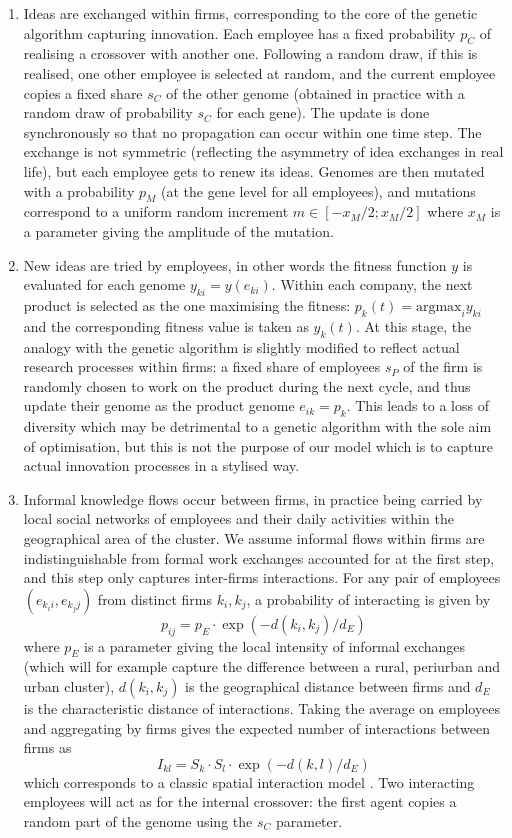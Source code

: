 \documentclass[letterpaper]{article}
\begin{document}
\begin{enumerate}
    \item Ideas are exchanged within firms, corresponding to the core of the genetic algorithm capturing innovation. Each employee has a fixed probability $p_C$ of realising a crossover with another one. Following a random draw, if this is realised, one other employee is selected at random, and the current employee copies a fixed share $s_C$ of the other genome (obtained in practice with a random draw of probability $s_C$ for each gene). The update is done synchronously so that no propagation can occur within one time step. The exchange is not symmetric (reflecting the asymmetry of idea exchanges in real life), but each employee gets to renew its ideas. Genomes are then mutated with a probability $p_M$ (at the gene level for all employees), and mutations correspond to a uniform random increment $m \in \left[ -x_M/2 ; x_M/2 \right]$ where $x_M$ is a parameter giving the amplitude of the mutation.
    \item New ideas are tried by employees, in other words the fitness function $y$ is evaluated for each genome $y_{ki} = y(e_{ki})$. Within each company, the next product is selected as the one maximising the fitness: $p_k (t) = \textrm{argmax}_i y_{ki}$ and the corresponding fitness value is taken as $y_k (t)$. At this stage, the analogy with the genetic algorithm is slightly modified to reflect actual research processes within firms: a fixed share of employees $s_P$ of the firm is randomly chosen to work on the product during the next cycle, and thus update their genome as the product genome $e_{ik} = p_k$. This leads to a loss of diversity which may be detrimental to a genetic algorithm with the sole aim of optimisation, but this is not the purpose of our model which is to capture actual innovation processes in a stylised way.
    \item Informal knowledge flows occur between firms, in practice being carried by local social networks of employees and their daily activities within the geographical area of the cluster. We assume informal flows within firms are indistinguishable from formal work exchanges accounted for at the first step, and this step only captures inter-firms interactions. For any pair of employees $(e_{k_i i}, e_{k_j j})$ from distinct firms $k_i,k_j$, a probability of interacting is given by
    \[
    p_{ij} = p_E \cdot \exp{\left( - d(k_i,k_j) / d_E \right)}
    \]
    where $p_E$ is a parameter giving the local intensity of informal exchanges (which will for example capture the difference between a rural, periurban and urban cluster), $d(k_i,k_j)$ is the geographical distance between firms and $d_E$ is the characteristic distance of interactions. Taking the average on employees and aggregating by firms gives the expected number of interactions between firms as
    \[
    I_{kl} = S_k \cdot S_l \cdot \exp{\left( - d(k,l) / d_E \right)}
    \]
    which corresponds to a classic spatial interaction model \citep{wilson1975some}. Two interacting employees will act as for the internal crossover: the first agent copies a random part of the genome using the $s_C$ parameter.
\end{enumerate}
\end{document}
